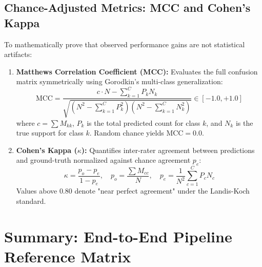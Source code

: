 \documentclass[a4paper, 11pt]{article}
\begin{document}
\subsection{Chance-Adjusted Metrics: MCC and Cohen's Kappa}
To mathematically prove that observed performance gains are not statistical artifacts:
\begin{enumerate}
    \item \textbf{Matthews Correlation Coefficient (MCC):} Evaluates the full confusion matrix symmetrically using Gorodkin's multi-class generalization:
    \begin{equation}
        \text{MCC} = \frac{c \cdot N - \sum_{k=1}^C P_k N_k}{\sqrt{\left(N^2 - \sum_{k=1}^C P_k^2\right)\left(N^2 - \sum_{k=1}^C N_k^2\right)}} \in [-1.0, +1.0]
    \end{equation}
    where $c = \sum M_{kk}$, $P_k$ is the total predicted count for class $k$, and $N_k$ is the true support for class $k$. Random chance yields $\text{MCC} = 0.0$.
    \item \textbf{Cohen's Kappa ($\kappa$):} Quantifies inter-rater agreement between predictions and ground-truth normalized against chance agreement $p_e$:
    \begin{equation}
        \kappa = \frac{p_o - p_e}{1 - p_e}, \quad p_o = \frac{\sum M_{cc}}{N}, \quad p_e = \frac{1}{N^2}\sum_{c=1}^C P_c N_c
    \end{equation}
    Values above $0.80$ denote "near perfect agreement" under the Landis-Koch standard.
\end{enumerate}

\section{Summary: End-to-End Pipeline Reference Matrix}
\end{document}
